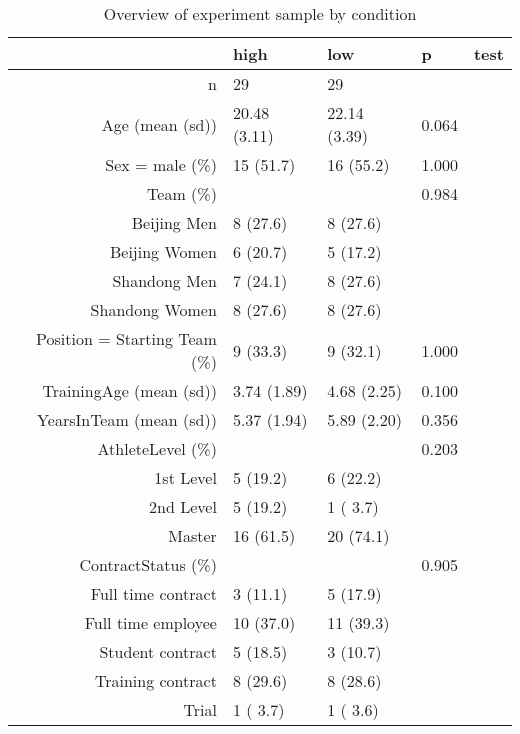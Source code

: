 \begin{table}[ht]
\centering
\begin{tabular}{rllll}
  \hline
 & high & low & p & test \\ 
  \hline
n &    29 &    29 &  &  \\ 
  Age (mean (sd)) & 20.48 (3.11) & 22.14 (3.39) &  0.064 &  \\ 
  Sex = male (\%) &    15 (51.7)  &    16 (55.2)  &  1.000 &  \\ 
  Team (\%) &     &     &  0.984 &  \\ 
     Beijing Men &     8 (27.6)  &     8 (27.6)  &  &  \\ 
     Beijing Women &     6 (20.7)  &     5 (17.2)  &  &  \\ 
     Shandong Men &     7 (24.1)  &     8 (27.6)  &  &  \\ 
     Shandong Women &     8 (27.6)  &     8 (27.6)  &  &  \\ 
  Position = Starting Team (\%) &     9 (33.3)  &     9 (32.1)  &  1.000 &  \\ 
  TrainingAge (mean (sd)) &  3.74 (1.89) &  4.68 (2.25) &  0.100 &  \\ 
  YearsInTeam (mean (sd)) &  5.37 (1.94) &  5.89 (2.20) &  0.356 &  \\ 
  AthleteLevel (\%) &     &     &  0.203 &  \\ 
     1st Level &     5 (19.2)  &     6 (22.2)  &  &  \\ 
     2nd Level &     5 (19.2)  &     1 ( 3.7)  &  &  \\ 
     Master &    16 (61.5)  &    20 (74.1)  &  &  \\ 
  ContractStatus (\%) &     &     &  0.905 &  \\ 
     Full time contract &     3 (11.1)  &     5 (17.9)  &  &  \\ 
     Full time employee &    10 (37.0)  &    11 (39.3)  &  &  \\ 
     Student contract &     5 (18.5)  &     3 (10.7)  &  &  \\ 
     Training contract &     8 (29.6)  &     8 (28.6)  &  &  \\ 
     Trial &     1 ( 3.7)  &     1 ( 3.6)  &  &  \\ 
   \hline
\end{tabular}
\caption{Overview of experiment sample by condition} 
\label{tab:athleteDescriptivesConditionTraining}
\end{table}
